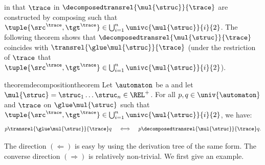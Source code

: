 in that  $\trace$ in $\decomposedtransrel{\mul{\struc}}{\trace}$ are
constructed by composing  such that $\tuple{\src^{\trace}, \tgt^{\trace}} \in \bigcup_{i = 1}^n \univc{\mul{\struc}}{i}{2}$.
The following theorem shows that $\decomposedtransrel{\mul{\struc}}{\trace}$ coincides with $\transrel{\glue \mul{\struc}}{\trace}$
(under the restriction of  $\trace$ that $\tuple{\src^{\trace}, \tgt^{\trace}} \in \bigcup_{i = 1}^n \univc{\mul{\struc}}{i}{2}$).
\begin{restatable}{theorem}{decompositiontheorem}\label{theorem: decomposition}
    Let $\automaton$ be a  and let $\mul{\struc} = \struc_1 \dots \struc_n \in \REL^{+}$.
    For all $p, q \in \univ{\automaton}$ and  $\trace$ on $\glue\mul{\struc}$ such that $\tuple{\src^{\trace}, \tgt^{\trace}} \in \bigcup_{i = 1}^n \univc{\mul{\struc}}{i}{2}$,
    we have:
    \[p \transrel{\glue \mul{\struc}}{\trace} q \quad\iff\quad p \decomposedtransrel{\mul{\struc}}{\trace} q.\]
\end{restatable}
The direction $(\Longleftarrow)$ is easy by using the derivation tree of the same form.
The converse direction $(\Longrightarrow)$ is relatively non-trivial.
We first give an example.
